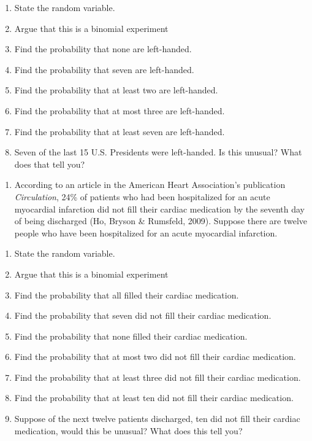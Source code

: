 \documentclass[
]{book}
\providecommand{\tightlist}{%
  \setlength{\itemsep}{0pt}\setlength{\parskip}{0pt}}
\begin{document}
\begin{enumerate}
\def\labelenumi{\alph{enumi}.}
\tightlist
\item
  State the random variable.
\item
  Argue that this is a binomial experiment
\item
  Find the probability that none are left-handed.
\item
  Find the probability that seven are left-handed.
\item
  Find the probability that at least two are left-handed.
\item
  Find the probability that at most three are left-handed.
\item
  Find the probability that at least seven are left-handed.
\item
  Seven of the last 15 U.S. Presidents were left-handed. Is this
  unusual? What does that tell you?
\end{enumerate}

\begin{enumerate}
\def\labelenumi{\arabic{enumi}.}
\setcounter{enumi}{1}
\tightlist
\item
  According to an article in the American Heart Association's publication \emph{Circulation}, 24\% of patients who had been hospitalized for an acute myocardial infarction did not fill their cardiac medication by the seventh day of being discharged (Ho, Bryson \& Rumsfeld, 2009). Suppose there are twelve people who have been hospitalized for an acute myocardial infarction.
\end{enumerate}

\begin{enumerate}
\def\labelenumi{\alph{enumi}.}
\tightlist
\item
  State the random variable.
\item
  Argue that this is a binomial experiment
\item
  Find the probability that all filled their cardiac medication.
\item
  Find the probability that seven did not fill their cardiac medication.
\item
  Find the probability that none filled their cardiac medication.
\item
  Find the probability that at most two did not fill their cardiac medication.
\item
  Find the probability that at least three did not fill their cardiac medication.
\item
  Find the probability that at least ten did not fill their cardiac medication.
\item
  Suppose of the next twelve patients discharged, ten did not fill their cardiac medication, would this be unusual? What does this tell you?
\end{enumerate}
\end{document}
